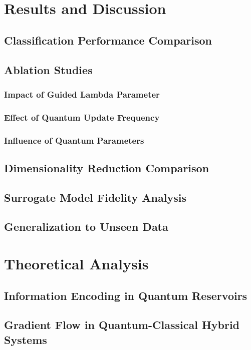 \documentclass[conference]{IEEEtran}
\begin{document}
\section{Results and Discussion}
\subsection{Classification Performance Comparison}
\subsection{Ablation Studies}
\subsubsection{Impact of Guided Lambda Parameter}
\subsubsection{Effect of Quantum Update Frequency}
\subsubsection{Influence of Quantum Parameters}
\subsection{Dimensionality Reduction Comparison}
\subsection{Surrogate Model Fidelity Analysis}
\subsection{Generalization to Unseen Data}

\section{Theoretical Analysis}
\subsection{Information Encoding in Quantum Reservoirs}
\subsection{Gradient Flow in Quantum-Classical Hybrid Systems}
\end{document}
